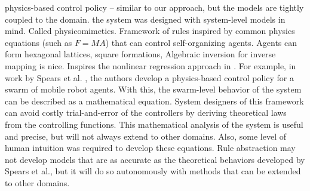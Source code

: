 physics-based control policy \cite{spears2004dpb} -- similar to our approach, but the models are tightly coupled to the domain. the system was designed with system-level models in mind.
Called physicomimetics.
Framework of rules inspired by common physics equations (such as $F=MA$) that can control self-organizing agents.
Agents can form hexagonal lattices, square formations,
Algebraic inversion for inverse mapping is nice. Inspires the nonlinear regression approach in \fw.
For example, in work by Spears et al. \cite{spears2004dpb}, the authors develop a physics-based control policy for
a swarm of mobile robot agents. With this, the swarm-level behavior of the system can be described as a mathematical equation.
System designers of this framework can avoid costly trial-and-error of the controllers by deriving theoretical laws from the controlling functions.
This mathematical analysis of the system is useful and precise, but will
not always extend to other domains. Also, some level of human intuition was required to develop these equations.
Rule abstraction may not develop models that are as accurate as the theoretical behaviors developed by Spears et al., but it will do so
autonomously with methods that can be extended to other domains.

